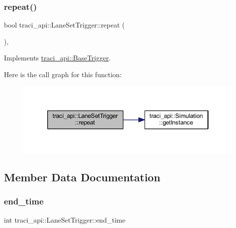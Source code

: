 \subsubsection{\texorpdfstring{repeat()}{repeat()}}
{\footnotesize\ttfamily bool traci\+\_\+api\+::\+Lane\+Set\+Trigger\+::repeat (\begin{DoxyParamCaption}{ }\end{DoxyParamCaption})\hspace{0.3cm}{\ttfamily [override]}, {\ttfamily [virtual]}}



Implements \hyperlink{classtraci__api_1_1_base_trigger_a7d2b1ac3f54e42e71eae69f1c7f33943}{traci\+\_\+api\+::\+Base\+Trigger}.

Here is the call graph for this function\+:
\nopagebreak
\begin{figure}[H]
\begin{center}
\leavevmode
\includegraphics[width=346pt]{classtraci__api_1_1_lane_set_trigger_ae606560cb760e12b0f1a86407f614e18_cgraph}
\end{center}
\end{figure}


\subsection{Member Data Documentation}
\mbox{\label{classtraci__api_1_1_lane_set_trigger_a20d2e675f6c1d69246daa42eeac0153c}} 
\subsubsection{\texorpdfstring{end\+\_\+time}{end\_time}}
{\footnotesize\ttfamily int traci\+\_\+api\+::\+Lane\+Set\+Trigger\+::end\+\_\+time}

\mbox{\label{classtraci__api_1_1_lane_set_trigger_ad39b2db18176f0a7d40da0bb3878e519}} 
